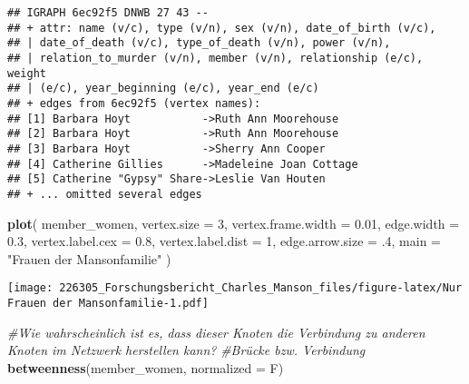 \documentclass[
]{article}
\newenvironment{Shaded}{\begin{snugshade}}{\end{snugshade}}
\newcommand{\CommentTok}[1]{\textcolor[rgb]{0.56,0.35,0.01}{\textit{#1}}}
\newcommand{\DataTypeTok}[1]{\textcolor[rgb]{0.13,0.29,0.53}{#1}}
\newcommand{\DecValTok}[1]{\textcolor[rgb]{0.00,0.00,0.81}{#1}}
\newcommand{\FloatTok}[1]{\textcolor[rgb]{0.00,0.00,0.81}{#1}}
\newcommand{\KeywordTok}[1]{\textcolor[rgb]{0.13,0.29,0.53}{\textbf{#1}}}
\newcommand{\NormalTok}[1]{#1}
\newcommand{\StringTok}[1]{\textcolor[rgb]{0.31,0.60,0.02}{#1}}
\begin{document}
\begin{verbatim}
## IGRAPH 6ec92f5 DNWB 27 43 -- 
## + attr: name (v/c), type (v/n), sex (v/n), date_of_birth (v/c),
## | date_of_death (v/c), type_of_death (v/n), power (v/n),
## | relation_to_murder (v/n), member (v/n), relationship (e/c), weight
## | (e/c), year_beginning (e/c), year_end (e/c)
## + edges from 6ec92f5 (vertex names):
## [1] Barbara Hoyt           ->Ruth Ann Moorehouse   
## [2] Barbara Hoyt           ->Ruth Ann Moorehouse   
## [3] Barbara Hoyt           ->Sherry Ann Cooper     
## [4] Catherine Gillies      ->Madeleine Joan Cottage
## [5] Catherine "Gypsy" Share->Leslie Van Houten     
## + ... omitted several edges
\end{verbatim}

\begin{Shaded}
\begin{Highlighting}[]
\KeywordTok{plot}\NormalTok{(}
\NormalTok{  member_women,}
  \DataTypeTok{vertex.size =} \DecValTok{3}\NormalTok{,}
  \DataTypeTok{vertex.frame.width =} \FloatTok{0.01}\NormalTok{,}
  \DataTypeTok{edge.width =} \FloatTok{0.3}\NormalTok{,}
  \DataTypeTok{vertex.label.cex =} \FloatTok{0.8}\NormalTok{,}
  \DataTypeTok{vertex.label.dist =} \DecValTok{1}\NormalTok{,}
  \DataTypeTok{edge.arrow.size =} \FloatTok{.4}\NormalTok{,}
  \DataTypeTok{main =} \StringTok{"Frauen der Mansonfamilie"}
\NormalTok{)}
\end{Highlighting}
\end{Shaded}

\texttt{[image: 226305\_Forschungsbericht\_Charles\_Manson\_files/figure-latex/Nur Frauen der Mansonfamilie-1.pdf]}

\begin{Shaded}
\begin{Highlighting}[]
\CommentTok{#Wie wahrscheinlich ist es, dass dieser Knoten die Verbindung zu anderen Knoten im Netzwerk herstellen kann? }
\CommentTok{#Brücke bzw. Verbindung}
\KeywordTok{betweenness}\NormalTok{(member_women, }\DataTypeTok{normalized =}\NormalTok{ F)}
\end{Highlighting}
\end{Shaded}
\end{document}

